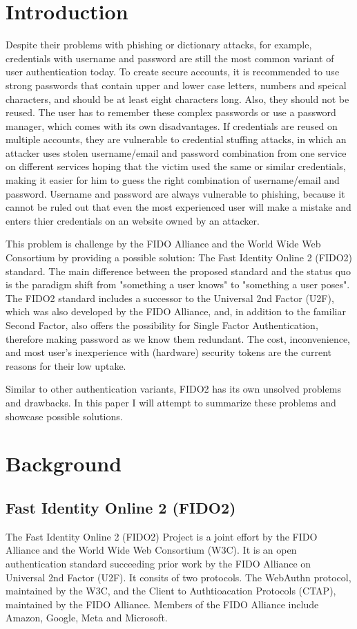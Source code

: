 \documentclass[runningheads]{llncs}
\begin{document}
\section{Introduction}
Despite their problems with phishing or dictionary attacks, for example, credentials with username and password are still the most common variant of user authentication today. To create secure accounts, it is recommended to use strong passwords that contain upper and lower case letters, numbers and speical characters, and should be at least eight characters long. Also, they should not be reused. The user has to remember these complex passwords or use a password manager, which comes with its own disadvantages. If credentials are reused on multiple accounts, they are vulnerable to credential stuffing attacks, in which an attacker uses stolen username/email and password combination from one service on different services hoping that the victim used the same or similar credentials, making it easier for him to guess the right combination of username/email and password. Username and password are always vulnerable to phishing, because it cannot be ruled out that even the most experienced user will make a mistake and enters thier credentials on an website owned by an attacker.

This problem is challenge by the FIDO Alliance and the World Wide Web Consortium by providing a possible solution: The Fast Identity Online 2 (FIDO2) standard. The main difference between the proposed standard and the status quo is the paradigm shift from "something a user knows" to "something a user poses". The FIDO2 standard includes a successor to the Universal 2nd Factor (U2F), which was also developed by the FIDO Alliance, and, in addition to the familiar Second Factor, also offers the possibility for Single Factor Authentication, therefore making password as we know them redundant. The cost, inconvenience, and most user's inexperience with (hardware) security tokens are the current reasons for their low uptake.\cite{274547}\cite{9152694}

Similar to other authentication variants, FIDO2 has its own unsolved problems and drawbacks. In this paper I will attempt to summarize these problems and showcase possible solutions. 

\section{Background}
\subsection{Fast Identity Online 2 (FIDO2)}
The Fast Identity Online 2 (FIDO2) Project is a joint effort by the FIDO Alliance and the World Wide Web Consortium (W3C). It is an open authentication standard succeeding prior work by the FIDO Alliance on Universal 2nd Factor (U2F). \cite{9152694}  It consits of two protocols. The WebAuthn protocol, maintained by the W3C, and the Client to Authtioacation Protocols (CTAP), maintained by the FIDO Alliance. Members of the FIDO Alliance include Amazon, Google, Meta and Microsoft.
\end{document}
